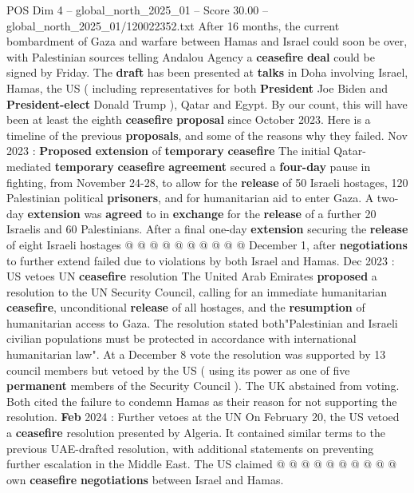 \begin{textsample}{POS Dim 4 – global\_north\_2025\_01 – Score 30.00 – global\_north\_2025\_01/120022352.txt}  \label{ex:f4_pos_043}
After 16 months, the current bombardment of Gaza and warfare between Hamas and Israel could soon be over, with Palestinian sources telling Andalou Agency a \textbf{ceasefire} \textbf{deal} could be signed by Friday.
The \textbf{draft} has been presented at \textbf{talks} in Doha involving Israel, Hamas, the US ( including representatives for both \textbf{President} Joe Biden and \textbf{President-elect} Donald Trump ), Qatar and Egypt.
By our count, this will have been at least the eighth \textbf{ceasefire} \textbf{proposal} since October 2023.
Here is a timeline of the previous \textbf{proposals}, and some of the reasons why they failed.
Nov 2023 : \textbf{Proposed} \textbf{extension} of \textbf{temporary} \textbf{ceasefire} The initial Qatar-mediated \textbf{temporary} \textbf{ceasefire} \textbf{agreement} secured a \textbf{four-day} pause in fighting, from November 24-28, to allow for the \textbf{release} of 50 Israeli hostages, 120 Palestinian political \textbf{prisoners}, and for humanitarian aid to enter Gaza.
A two-day \textbf{extension} was \textbf{agreed} to in \textbf{exchange} for the \textbf{release} of a further 20 Israelis and 60 Palestinians.
After a final one-day \textbf{extension} securing the \textbf{release} of eight Israeli hostages @ @ @ @ @ @ @ @ @ @ December 1, after \textbf{negotiations} to further extend failed due to violations by both Israel and Hamas.
Dec 2023 : US vetoes UN \textbf{ceasefire} resolution The United Arab Emirates \textbf{proposed} a resolution to the UN Security Council, calling for an immediate humanitarian \textbf{ceasefire}, unconditional \textbf{release} of all hostages, and the \textbf{resumption} of humanitarian access to Gaza.
The resolution stated both"Palestinian and Israeli civilian populations must be protected in accordance with international humanitarian law".
At a December 8 vote the resolution was supported by 13 council members but vetoed by the US ( using its power as one of five \textbf{permanent} members of the Security Council ).
The UK abstained from voting.
Both cited the failure to condemn Hamas as their reason for not supporting the resolution. \textbf{Feb} 2024 : Further vetoes at the UN On February 20, the US vetoed a \textbf{ceasefire} resolution presented by Algeria.
It contained similar terms to the previous UAE-drafted resolution, with additional statements on preventing further escalation in the Middle East.
The US claimed @ @ @ @ @ @ @ @ @ @ own \textbf{ceasefire} \textbf{negotiations} between Israel and Hamas.

\end{textsample}
